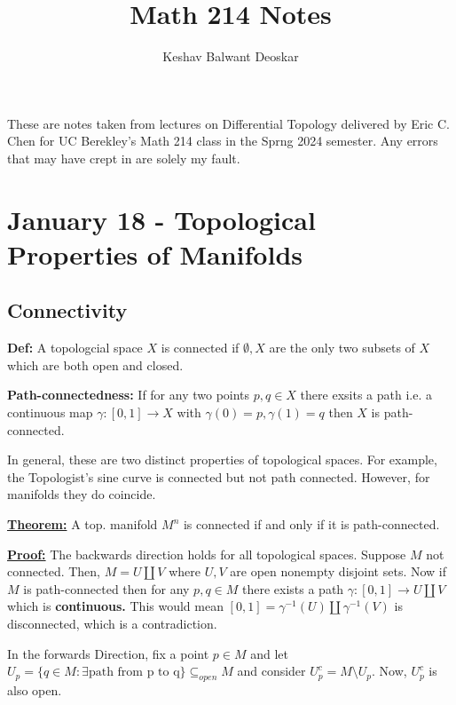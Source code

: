 \documentclass{article}
\title{Math 214 Notes}
\author{Keshav Balwant Deoskar}
\begin{document}
\maketitle

These are notes taken from lectures on Differential Topology delivered by Eric C. Chen for UC Berekley's Math 214 class in the Sprng 2024 semester. Any errors that may have crept in are solely my fault.

\tableofcontents

\pagebreak

\section{January 18 - Topological Properties of Manifolds}
\vskip 0.5cm

\subsection{Connectivity}
\vskip 0.5cm

\textbf{Def:} A topologcial space $X$ is connected if $\emptyset, X$ are the only two subsets of $X$ which are both open and closed.

\vskip 0.5cm
\textbf{Path-connectedness:} If for any two points $p, q \in X$ there exsits a path i.e. a continuous map $\gamma : [0, 1] \rightarrow X$ with $\gamma(0) = p, \gamma(1) = q$ then $X$ is path-connected.

\vskip 0.5cm
In general, these are two distinct properties of topological spaces. For example, the Topologist's sine curve is connected but not path connected. However, for manifolds they do coincide.

\vskip 0.5cm
\underline{\textbf{Theorem:}} A top. manifold $M^n$ is connected if and only if it is path-connected.

\vskip 0.5cm
\underline{\textbf{Proof:}}
\vskip 0.5cm
The backwards direction holds for all topological spaces. Suppose $M$ not connected. Then, $M = U \coprod V$ where $U, V$ are open nonempty disjoint sets. Now if $M$ is path-connected then for any $p, q \in M$ there exists a path $\gamma : [0, 1] \rightarrow U \coprod V$ which is \textbf{continuous.} This would mean $[0, 1] = \gamma^{-1}(U) \coprod \gamma^{-1}(V)$ is disconnected, which is a contradiction.

\vskip 0.5cm
In the forwards Direction, fix a point $p \in M$ and let $U_p = \{ q \in M : \exists \text{path from p to q}\} \subseteq_{open} M$ and consider $U_p^{c} = M \setminus U_p$. Now, $U_p^c$ is also open. 
\end{document}
